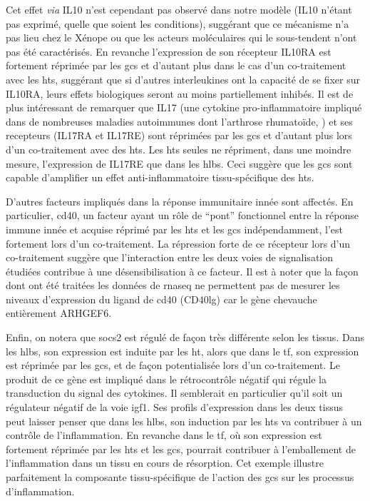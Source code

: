 \documentclass[../main.tex]{subfiles}
\begin{document}
		Cet effet \textit{via} IL10 n'est cependant pas observé dans notre modèle (IL10 n'étant pas exprimé, quelle que soient les conditions), suggérant que ce mécanisme n'a pas lieu chez le Xénope ou que les acteurs moléculaires qui le sous-tendent n'ont pas été caractérisés.
		En revanche l'expression de son récepteur IL10RA est fortement réprimée par les \glspl{gc} et d'autant plus dans le cas d'un co-traitement avec les \glspl{ht}, suggérant que si d'autres interleukines ont la capacité de se fixer sur IL10RA, leurs effets biologiques seront au moins partiellement inhibés.
		Il est de plus intéressant de remarquer que IL17 (une cytokine pro-inflammatoire impliqué dans de nombreuses maladies autoimmunes dont l'arthrose rhumatoïde, \citealp{Onishi2010}) et ses recepteurs (IL17RA et IL17RE) sont réprimées par les \glspl{gc} et d'autant plus lors d'un co-traitement avec des \glspl{ht}.
		Les \glspl{ht} seules ne répriment, dans une moindre mesure, l'expression de IL17RE que dans les \glspl{hlb}.
		Ceci suggère que les \glspl{gc} sont capable d'amplifier un effet anti-inflammatoire tissu-spécifique des \glspl{ht}.
		\par
		D'autres facteurs impliqués dans la réponse immunitaire innée sont affectés.
		En particulier, \gls{cd40}, un facteur ayant un rôle de ``pont'' fonctionnel entre la réponse immune innée et acquise \citep{Elgueta2009,Fujii2004} réprimé par les \glspl{ht} et les \glspl{gc} indépendamment, l'est fortement lors d'un co-traitement.
		La répression forte de ce récepteur lors d'un co-traitement suggère que l'interaction entre les deux voies de signalisation étudiées contribue à une désensibilisation à ce facteur.
		Il est à noter que la façon dont ont été traitées les données de \gls{rnaseq} ne permettent pas de mesurer les niveaux d'expression du ligand de \gls{cd40} (CD40lg) car le gène chevauche entièrement ARHGEF6.
		\par
		Enfin, on notera que \gls{socs2} est régulé de façon très différente selon les tissus.
		Dans les \glspl{hlb}, son expression est induite par les \gls{ht}, alors que dans le \gls{tf}, son expression est réprimée par les \glspl{gc}, et de façon potentialisée lors d'un co-traitement.
		Le produit de ce gène est impliqué dans le rétrocontrôle négatif qui régule la transduction du signal des cytokines.
		Il semblerait en particulier qu'il soit un régulateur négatif de la voie \gls{igf}1.
		Ses profils d'expression dans les deux tissus peut laisser penser que dans les \glspl{hlb}, son induction par les \glspl{ht} va contribuer à un contrôle de l'inflammation.
		En revanche dans le \gls{tf}, où son expression est fortement réprimée par les \glspl{ht} et les \glspl{gc}, pourrait contribuer à l'emballement de l'inflammation dans un tissu en cours de résorption.
		Cet exemple illustre parfaitement la composante tissu-spécifique de l'action des \glspl{gc} sur les processus d'inflammation.
\end{document}
